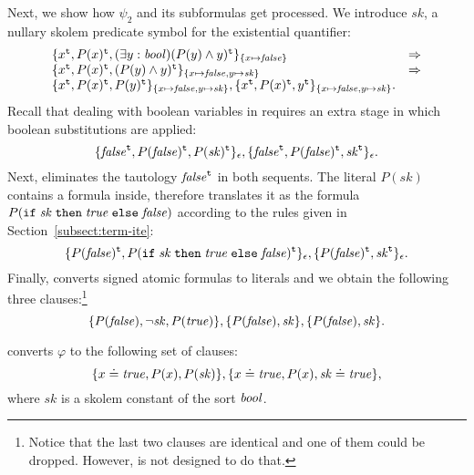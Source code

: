 \begin{example}
Next, we show how $\psi_2$ and its subformulas get processed. 
We introduce $\mathit{sk}$, a nullary skolem predicate symbol for the existential quantifier:
\[
\begin{array}{ll}
\{x^{\mathtt{t}}, P(x)^{\mathtt{t}}, (\exists y:\mathit{bool})(P(y) \land y)^{\mathtt{t}}\}_{\{x \mapsto \mathit{false}\}} & \Rightarrow\\
\{x^{\mathtt{t}}, P(x)^{\mathtt{t}}, (P(y) \land y)^{\mathtt{t}}\}_{\{x \mapsto \mathit{false}, y \mapsto \mathit{sk}\}} & \Rightarrow\\
\{x^{\mathtt{t}}, P(x)^{\mathtt{t}}, P(y)^{\mathtt{t}}\}_{\{x \mapsto \mathit{false}, y \mapsto \mathit{sk}\}}, 
\{x^{\mathtt{t}}, P(x)^{\mathtt{t}}, y^{\mathtt{t}}\}_{\{x \mapsto \mathit{false}, y \mapsto \mathit{sk}\}}.
\end{array}
\]
Recall that dealing with boolean variables in \nfcnf{} requires an extra stage in which boolean substitutions are applied:
\[
\{\mathit{false}^{\mathtt{t}}, P(\mathit{false})^{\mathtt{t}}, P(\mathit{sk})^{\mathtt{t}}\}_\epsilon, 
\{\mathit{false}^{\mathtt{t}}, P(\mathit{false})^{\mathtt{t}}, \mathit{sk}^{\mathtt{t}}\}_\epsilon.
\]
Next, \nfcnf{} eliminates the tautology ${\mathit{false}}^{\mathtt{t}}$ in both sequents. The literal $P(\mathit{sk})$ contains a formula inside, therefore \nfcnf{} translates it as the formula $P(\mathtt{if}\;{\mathit{sk}}\;\allowbreak\mathtt{then}\;{\mathit{true}}\;\allowbreak\mathtt{else}\;{\mathit{false}})$ according to the rules given in Section~\ref{subsect:term-ite}:
\[
\{P(\mathit{false})^{\mathtt{t}}, P(\mathtt{if}\;{\mathit{sk}}\;\allowbreak\mathtt{then}\;{\mathit{true}}\;\allowbreak\mathtt{else}\;{\mathit{false}})^{\mathtt{t}}\}_\epsilon, 
\{P(\mathit{false})^{\mathtt{t}}, \mathit{sk}^{\mathtt{t}}\}_\epsilon.
\]
Finally, \nfcnf{} converts signed atomic formulas to literals and we obtain the following three clauses:\footnote{Notice that the last two clauses are identical and one of them could be dropped. 
However, \nfcnf{} is not designed to do that.}
\[
\{P(\mathit{false}), \neg \mathit{sk}, P(\mathit{true})\}, \{P(\mathit{false}), \mathit{sk}\}, \{P(\mathit{false}), \mathit{sk}\}.
\]

\oldcnf{} converts $\varphi$ to the following set of clauses:
$$\{ x \doteq \mathit{true}, P(x), P(\mathit{sk}) \}, \{ x \doteq \mathit{true}, P(x), \mathit{sk}\doteq \mathit{true} \},$$
where $\mathit{sk}$ is a skolem constant of the sort $\mathit{bool}$.
\QED\end{example}


